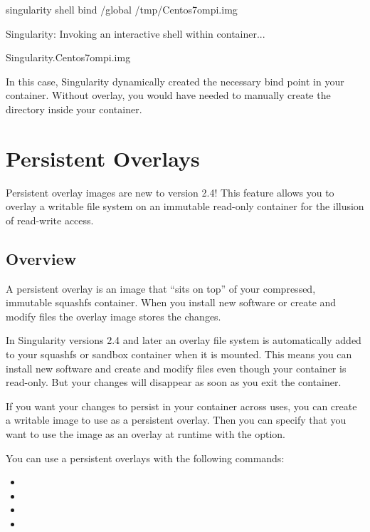 \documentclass[letterpaper,10pt,english]{sphinxmanual}
\begin{document}
%
\begin{sphinxVerbatim}[commandchars=\\\{\}]
\PYGZdl{} singularity shell \PYGZhy{}\PYGZhy{}bind /global /tmp/Centos7\PYGZhy{}ompi.img

Singularity: Invoking an interactive shell within container...


Singularity.Centos7\PYGZhy{}ompi.img\PYGZgt{}
\end{sphinxVerbatim}

In this case, Singularity dynamically created the necessary bind point
in your container. Without overlay, you would have needed to manually
create the  directory inside your container.


\chapter{Persistent Overlays}
\label{\detokenize{persistent_overlays:persistent-overlays}}\label{\detokenize{persistent_overlays::doc}}
Persistent overlay images are new to version 2.4! This feature allows
you to overlay a writable file system on an immutable read-only
container for the illusion of read-write access.


\section{Overview}
\label{\detokenize{persistent_overlays:overview}}
A persistent overlay is an image that “sits on top” of your
compressed, immutable squashfs container. When you install new
software or create and modify files the overlay image stores the
changes.

In Singularity versions 2.4 and later an overlay file system is
automatically added to your squashfs or sandbox container when it is
mounted. This means you can install new software and create and modify
files even though your container is read-only. But your changes will
disappear as soon as you exit the container.

If you want your changes to persist in your container across uses, you
can create a writable image to use as a persistent overlay. Then you
can specify that you want to use the image as an overlay at runtime
with the  option.

You can use a persistent overlays with the following commands:
\begin{itemize}
\item {} 

\item {} 

\item {} 

\item {} 

\end{itemize}
\end{document}
